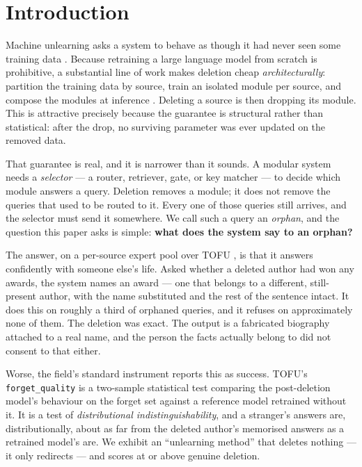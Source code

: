\documentclass[11pt]{article}
\newcommand{\fq}{\texttt{forget\_quality}}
\begin{document}
\section{Introduction}
\label{sec:intro}

Machine unlearning asks a system to behave as though it had never seen some training data
\citep{bourtoule2021sisa}. Because retraining a large language model from scratch is
prohibitive, a substantial line of work makes deletion cheap \emph{architecturally}: partition the
training data by source, train an isolated module per source, and compose the modules at inference
\citep{yu2022legonet,basuroychowdhury2025s3t,zhao2024ramole,grimes2026memadapt,schneider2026sea}.
Deleting a source is then dropping its module. This is attractive precisely because the guarantee is
structural rather than statistical: after the drop, no surviving parameter was ever updated on the
removed data.

That guarantee is real, and it is narrower than it sounds. A modular system needs a \emph{selector}
--- a router, retriever, gate, or key matcher --- to decide which module answers a query. Deletion
removes a module; it does not remove the queries that used to be routed to it. Every one of those
queries still arrives, and the selector must send it somewhere. We call such a query an
\emph{orphan}, and the question this paper asks is simple: \textbf{what does the system say to an
orphan?}

The answer, on a per-source expert pool over TOFU \citep{maini2024tofu}, is that it answers
confidently with someone else's life. Asked whether a deleted author had won any awards, the system
names an award --- one that belongs to a different, still-present author, with the name substituted
and the rest of the sentence intact. It does this on roughly a third of orphaned queries, and it
refuses on approximately none of them. The deletion was exact. The output is a fabricated biography
attached to a real name, and the person the facts actually belong to did not consent to that either.

Worse, the field's standard instrument reports this as success. TOFU's \fq{} is a two-sample
statistical test comparing the post-deletion model's behaviour on the forget set against a reference
model retrained without it. It is a test of \emph{distributional indistinguishability}, and a
stranger's answers are, distributionally, about as far from the deleted author's memorised answers
as a retrained model's are. We exhibit an ``unlearning method'' that deletes nothing --- it only
redirects --- and scores at or above genuine deletion.
\end{document}
